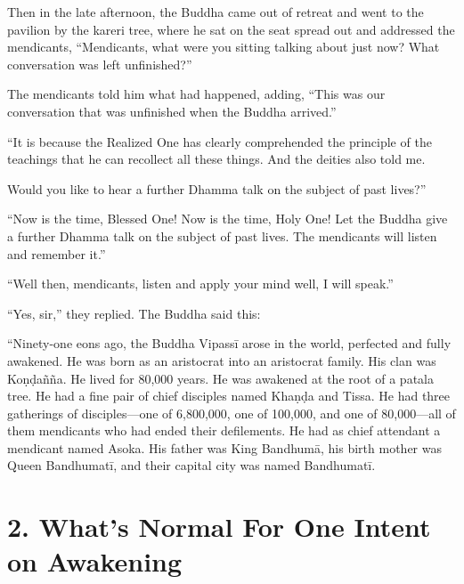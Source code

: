 \documentclass[12pt,openany]{book}%
\begin{document}
Then in the late afternoon, the Buddha came out of retreat and went to the pavilion by the kareri tree, where he sat on the seat spread out and addressed the mendicants, “Mendicants, what were you sitting talking about just now? What conversation was left unfinished?” 

The mendicants told him what had happened, adding, “This was our conversation that was unfinished when the Buddha arrived.” 

“It is because the Realized One has clearly comprehended the principle of the teachings that he can recollect all these things. And the deities also told me. 

Would you like to hear a further Dhamma talk on the subject of past lives?” 

“Now is the time, Blessed One! Now is the time, Holy One! Let the Buddha give a further Dhamma talk on the subject of past lives. The mendicants will listen and remember it.” 

“Well then, mendicants, listen and apply your mind well, I will speak.” 

“Yes, sir,” they replied. The Buddha said this: 

“Ninety-one eons ago, the Buddha \textsanskrit{Vipassī} arose in the world, perfected and fully awakened. He was born as an aristocrat into an aristocrat family. His clan was \textsanskrit{Koṇḍañña}. He lived for 80,000 years. He was awakened at the root of a patala tree. He had a fine pair of chief disciples named \textsanskrit{Khaṇḍa} and Tissa. He had three gatherings of disciples—one of 6,800,000, one of 100,000, and one of 80,000—all of them mendicants who had ended their defilements. He had as chief attendant a mendicant named Asoka. His father was King \textsanskrit{Bandhumā}, his birth mother was Queen \textsanskrit{Bandhumatī}, and their capital city was named \textsanskrit{Bandhumatī}. 

\section*{2. What’s Normal For One Intent on Awakening }
\end{document}
